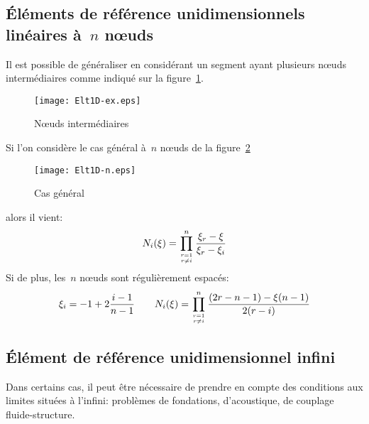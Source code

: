 \medskip
\subsection{Éléments de référence unidimensionnels linéaires à~$n$ nœuds}

Il est possible de généraliser en considérant un segment ayant plusieurs nœuds intermédiaires comme indiqué sur la figure~\ref{fig:ex2:noeudint}.
\begin{figure}[ht]\centering
\texttt{[image: Elt1D-ex.eps]}
\caption{Nœuds intermédiaires}\label{fig:ex2:noeudint}
\end{figure}
\medskipvm
Si l'on considère le cas général à~$n$ nœuds de la figure~\ref{fig:ex2:casgen}
\begin{figure}[ht]\centering
\texttt{[image: Elt1D-n.eps]}
\caption{Cas général}\label{fig:ex2:casgen}
\end{figure}
alors il vient:
\begin{equation} N_i(\xi) = \prod_{r=1\atop r\ne i}^n \dfrac{\xi_r-\xi}{\xi_r-\xi_i} \end{equation}
\medskipvm
Si de plus, les~$n$ nœuds sont régulièrement espacés:
\begin{equation}\xi_i = -1+2\frac{i-1}{n-1} \qquad
N_i(\xi) = \prod_{r=1\atop r\ne i}^n \dfrac{(2r-n-1)-\xi(n-1)}{2(r-i)} \end{equation}

\medskip
\subsection{Élément de référence unidimensionnel infini}

Dans certains cas, il peut être nécessaire de prendre en compte des conditions aux limites situées à l'infini: problèmes de fondations, d'acoustique, de couplage fluide-structure.


